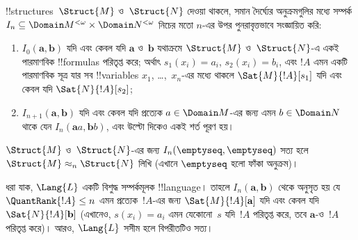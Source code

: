 \documentclass[../../../include/open-logic-section]{subfiles}
\begin{document}
\begin{defn}
  !!{structure}s~$\Struct{M}$ ও~$\Struct{N}$ দেওয়া থাকলে, সমান দৈর্ঘ্যের
  অনুক্রমগুলির মধ্যে সম্পর্ক $I_n \subseteq \Domain M^{<\omega}
  \times \Domain N^{<\omega}$ নিচের মতো $n$-এর উপর পুনরাবৃত্তভাবে
  সংজ্ঞায়িত করি:
   \begin{enumerate}
   \item $I_0(\mathbf{a},\mathbf{b})$ যদি এবং কেবল যদি
     $\mathbf{a}$ ও~$\mathbf{b}$ যথাক্রমে $\Struct{M}$ ও~$\Struct{N}$-এ
     একই পারমাণবিক !!{formula}s পরিতৃপ্ত করে; অর্থাৎ $s_1(x_i) = a_i$,
     $s_2(x_i) = b_i$, এবং $!A$ এমন একটি পারমাণবিক সূত্র যার সব
     !!{variable}s $x_1$, \dots,~$x_n$-এর মধ্যে থাকলে
     $\Sat{M}{!A}[s_1]$ যদি এবং কেবল যদি $\Sat{N}{!A}[s_2]$;
   \item $I_{n+1} (\mathbf{a},\mathbf{b})$ যদি এবং কেবল যদি প্রত্যেক
     $a\in \Domain M$-এর জন্য এমন $b\in \Domain N$ থাকে যেন $I_n
     (\mathbf{a}a,\mathbf{b}b)$, এবং উল্টো দিকেও একই শর্ত পূরণ হয়।
   \end{enumerate}
\end{defn}


\begin{defn}
  $\Struct{M}$ ও~$\Struct{N}$-এর জন্য
  $I_n(\emptyseq,\emptyseq)$ সত্য হলে $\Struct{M} \approx_n
  \Struct{N}$ লিখি (এখানে $\emptyseq$ হলো ফাঁকা অনুক্রম)।
\end{defn}

\begin{thm}
  ধরা যাক, $\Lang{L}$ একটি বিশুদ্ধ সম্পর্কমূলক !!{language}। তাহলে
  $I_n (\mathbf{a},\mathbf{b})$ থেকে অনুসৃত হয় যে
  $\QuantRank{!A} \le n$ এমন প্রত্যেক~$!A$-এর জন্য
  $\Sat{M}{!A}[\mathbf{a}]$ যদি এবং কেবল যদি
  $\Sat{N}{!A}[\mathbf{b}]$ (এখানেও, $s(x_i) = a_i$ এমন যেকোনো~$s$
  যদি~$!A$ পরিতৃপ্ত করে, তবে $\mathbf{a}$-ও~$!A$ পরিতৃপ্ত করে)। আরও,
  $\Lang{L}$ সসীম হলে বিপরীতটিও সত্য।
\end{thm}
\end{document}
